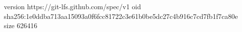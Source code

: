 version https://git-lfs.github.com/spec/v1
oid sha256:1e0ddba713aa15093a0f6fcc81722c3e61b0be5dc27c4b916c7cd7fb1f7ca80e
size 626416
